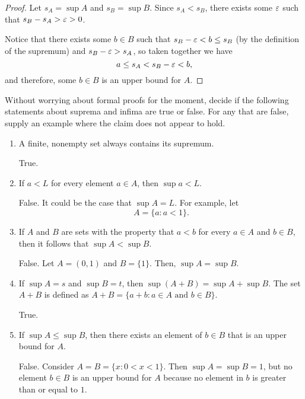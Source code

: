 \begin{proof}
  Let $s_A = \sup A$ and $s_B = \sup B$. Since $s_A < s_B$, there exists some
  $\varepsilon$ such that $s_B - s_A > \varepsilon > 0$. 

  Notice that there exists some $b \in B$ such that $s_B - \varepsilon < b \leq s_B$
  (by the definition of the supremum) and $s_B - \varepsilon > s_A$, so taken together
  we have 
  \[
    a \leq s_A < s_B - \varepsilon < b,
  \]
  and therefore, some $b \in B$ is an upper bound for $A$.
\end{proof}

\begin{problem} \label{prob:sup-inf-claims}
  Without worrying about formal proofs for the moment, decide if the following
  statements about suprema and infima are true or false. For any that are false,
  supply an example where the claim does not appear to hold.

  \begin{enumerate}[label=(\alph*)]
    \item A finite, nonempty set always contains its supremum. 

      True.

    \item If $a < L$ for every element $a \in A$, then $\sup a < L$.

      False. It could be the case that $\sup A = L$. For example, let
      \[
        A = \{ a : a < 1 \}.
      \]

    \item If $A$ and $B$ are sets with the property that $a < b$ for every $a
      \in A$ and $b \in B$, then it follows that $\sup A < \sup B$.

      False. Let $A = (0, 1)$ and $B = \{1\}$. Then, $\sup A = \sup B$.

    \item If $\sup A = s$ and $\sup B = t$, then $\sup (A + B) = \sup A + \sup B$.
      The set $A + B$ is defined as $A + B = \{a + b : a \in A \text{ and } b \in B\}$.

      True. 

    \item If $\sup A \leq \sup B$, then there exists an element of $b \in B$
      that is an upper bound for $A$. 

      False. Consider $A = B = \{ x : 0 < x < 1 \}$. Then $\sup A = \sup B = 1$,
      but no element $b \in B$ is an upper bound for $A$ because no element
      in $b$ is greater than or equal to $1$.

  \end{enumerate}

\end{problem}

